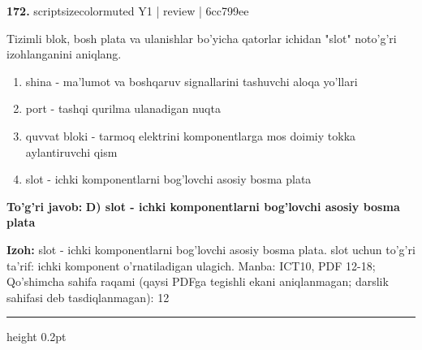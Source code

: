 \documentclass[10pt,a4paper]{article}
\begin{document}
{\bfseries\sffamily\color{ink} 172.} {scriptsizecolor{muted} Y1 | review | 6cc799ee}
\par
Tizimli blok, bosh plata va ulanishlar bo'yicha qatorlar ichidan "slot" noto'g'ri izohlanganini aniqlang.
\begin{enumerate}[label=\Alph*),leftmargin=9mm]
\item shina - ma'lumot va boshqaruv signallarini tashuvchi aloqa yo'llari
\item port - tashqi qurilma ulanadigan nuqta
\item quvvat bloki - tarmoq elektrini komponentlarga mos doimiy tokka aylantiruvchi qism
\item slot - ichki komponentlarni bog'lovchi asosiy bosma plata
\end{enumerate}
\begin{tcolorbox}[enhanced,breakable,colback=teal!4,colframe=teal!60!black,boxrule=0.45pt,arc=1.2mm,left=2.7mm,right=2.7mm,top=1.8mm,bottom=1.8mm,before skip=2mm,after skip=2mm]
{\bfseries\sffamily\color{teal}To'g'ri javob:} \textbf{D) slot - ichki komponentlarni bog'lovchi asosiy bosma plata}
\par\smallskip
{\bfseries Izoh:} slot - ichki komponentlarni bog'lovchi asosiy bosma plata. slot uchun to'g'ri ta'rif: ichki komponent o'rnatiladigan ulagich. Manba: ICT10, PDF 12-18; Qo'shimcha sahifa raqami (qaysi PDFga tegishli ekani aniqlanmagan; darslik sahifasi deb tasdiqlanmagan): 12
\end{tcolorbox}
\vspace{2mm}\hrule height 0.2pt\vspace{3mm}
\end{document}
